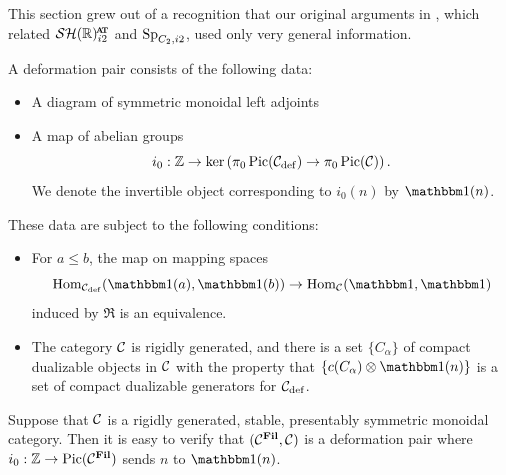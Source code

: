 This section grew out of a recognition that our original arguments in , which related $\SHRat$ and  $\operatorname{\mathrm{Sp}}_{C_2,i2}$, used only very general information.

\begin{dfn} \label{dfn:def-pair}
  A deformation pair consists of the following data:
  \begin{itemize}
  \item A diagram of symmetric monoidal left adjoints
    \begin{center}  \end{center}
  \item A map of abelian groups
    \[ i_0 : \mathbb{Z} \to \ker \left( \pi_0\operatorname{\mathrm{Pic}}(\mathcal{C}_{\mathrm{def}}) \to \pi_0\operatorname{\mathrm{Pic}}(\mathcal{C}) \right). \]
    We denote the invertible object corresponding to $i_0(n)$ by $\o(n)$.
  \end{itemize}
  These data are subject to the following conditions:
  \begin{itemize}
  \item For $a \leq b$, the map on mapping spaces
    \[ \Hom_{\CCdef} (\o(a),\o(b)) \to \Hom_{\CC} (\o,\o) \]
    induced by $\Re$ is an equivalence.
  \item The category $\mathcal{C}$ is rigidly generated, and there is a set
    $\{C_\alpha\}$ of compact dualizable objects in $\mathcal{C}$
    with the property that $\{c(C_{\alpha}) \otimes \o(n)\}$
    is a set of compact dualizable generators for $\mathcal{C}_{\mathrm{def}}$.
  \end{itemize}
\end{dfn}


\begin{exm}
  Suppose that $\mathcal{C}$ is a rigidly generated, stable, presentably symmetric monoidal category.
  Then it is easy to verify that $(\mathcal{C}^{\operatorname{\mathbf{Fil}}}, \mathcal{C})$ is a deformation pair where
  $i_0 : \mathbb{Z} \to \operatorname{\mathrm{Pic}}(\mathcal{C}^{\operatorname{\mathbf{Fil}}})$ sends $n$ to $\o(n)$.
\end{exm}

